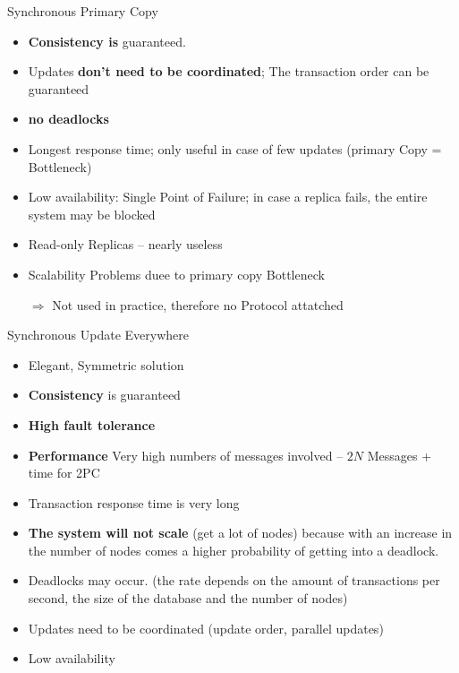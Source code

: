 \documentclass[a4paper,12pt]{article}%
\begin{document}
 
 Synchronous Primary Copy
 
 {\color[HTML]{9AB299} 
 \begin{itemize}
  \item {\bf Consistency is} guaranteed.
  \item Updates {\bf don't need to be coordinated}; The transaction order can be guaranteed
  \item {\bf no deadlocks}
 \end{itemize}

 }   
{\color[HTML]{A38C8C}
 \begin{itemize}
  \item Longest response time; only useful in case of few updates (primary Copy = Bottleneck)
  \item Low availability: Single Point of Failure; in case a replica fails, the entire system may be blocked
  \item Read-only Replicas -- nearly useless
  \item Scalability Problems duee to primary copy Bottleneck
  \item[$\Rightarrow$] Not used in practice, therefore no Protocol attatched
 \end{itemize}
 }
 
 
 Synchronous Update Everywhere
 
 {\color[HTML]{9AB299} 
 \begin{itemize}
  \item Elegant, Symmetric solution
  \item {\bf Consistency} is guaranteed
  \item {\bf High fault tolerance}
 \end{itemize}

 }   
{\color[HTML]{A38C8C}
 \begin{itemize}
  \item {\bf Performance} Very high numbers of messages involved -- $2N$ Messages + time for 2PC
  \item Transaction response time is very long
  \item {\bf The system will not scale} (get a lot of nodes) because with an increase in the number of nodes comes a higher probability of getting into a deadlock.
  \item Deadlocks may occur. (the rate depends on the amount of transactions per second, the size of the database and the number of nodes)
  
  \item Updates need to be coordinated (update order, parallel updates)
  \item Low availability
 \end{itemize}
 }
 
\end{document}
